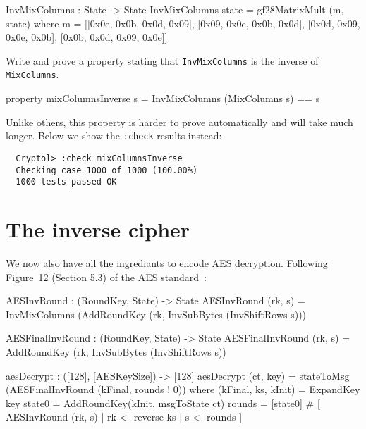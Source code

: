\begin{code}
  InvMixColumns : State -> State
  InvMixColumns state = gf28MatrixMult (m, state)
    where m = [[0x0e, 0x0b, 0x0d, 0x09],
               [0x09, 0x0e, 0x0b, 0x0d],
               [0x0d, 0x09, 0x0e, 0x0b],
               [0x0b, 0x0d, 0x09, 0x0e]]
\end{code}

\begin{Exercise}\label{ex:aesimc:0}
  Write and prove a property stating that {\tt InvMixColumns} is the
  inverse of {\tt MixColumns}.
\end{Exercise}
\begin{Answer}
\begin{code}
  property mixColumnsInverse s = InvMixColumns (MixColumns s) == s
\end{code}
Unlike others, this property is harder to prove automatically and will
take much longer. Below we show the {\tt :check} results instead:
\begin{Verbatim}
  Cryptol> :check mixColumnsInverse
  Checking case 1000 of 1000 (100.00%) 
  1000 tests passed OK
\end{Verbatim}

\end{Answer}

\section{The inverse cipher}
\label{sec:inverse-cipher}

We now also have all the ingrediants to encode AES decryption.
Following Figure~12 (Section 5.3) of the AES\indAES
standard~\cite{aes}: {\small
\begin{code}
  AESInvRound : (RoundKey, State) -> State
  AESInvRound (rk, s) =
    InvMixColumns (AddRoundKey (rk, InvSubBytes (InvShiftRows s)))

  AESFinalInvRound : (RoundKey, State) -> State
  AESFinalInvRound (rk, s) = AddRoundKey (rk, InvSubBytes (InvShiftRows s))

  aesDecrypt : ([128], [AESKeySize]) -> [128]
  aesDecrypt (ct, key) = stateToMsg (AESFinalInvRound (kFinal, rounds ! 0))
    where  
      (kFinal, ks, kInit) = ExpandKey key
      state0 = AddRoundKey(kInit, msgToState ct)
      rounds = [state0] # [ AESInvRound (rk, s) 
                          | rk <- reverse ks
                          | s  <- rounds
                          ]
\end{code}
}

